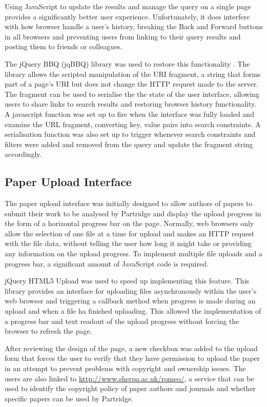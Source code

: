 Using JavaScript to update the results and manage the query on a single page
provides a significantly better user experience. Unfortunately, it does
interfere with how browser handle a user's history, breaking the Back and
Forward buttons in all browsers and preventing users from linking to their
query results and posting them to friends or colleagues.

The jQuery BBQ (jqBBQ) library was used to restore this functionality
\cite{jqbbq2013}. The library allows the scripted manipulation of the URI
fragment, a string that forms part of a page's URI but does not change the HTTP
request made to the server\cite{urifragment2013}. The fragment can be used to
serialise the the state of the user interface, allowing users to share links to
search results and restoring browser history functionality. A javascript
function was set up to fire when the interface was fully loaded and examine the
URL fragment, converting key, value pairs into search constraints. A
serialisation function was also set up to trigger whenever search constraints
and filters were added and removed from the query and update the fragment
string accordingly.

\subsection{ Paper Upload Interface }

The paper upload interface was initially designed to allow authors of papers to
submit their work to be analysed by Partridge and display the upload progress
in the form of a horizontal progress bar on the page. Normally, web browsers
only allow the selection of one file at a time for upload and makes an HTTP
request with the file data, without telling the user how long it might take or
providing any information on the upload progress. To implement multiple file
uploads and a progress bar, a significant amount of JavaScript code is
required. 

jQuery HTML5 Upload was used to speed up implementing this feature. This
library provides an interface for uploading files asynchronously within the
user's web browser and triggering a callback method when progress is made
during an upload and when a file ha finished uploading. This allowed the
implementation of a progress bar and text readout of the upload progress
without forcing the browser to refresh the page.

After reviewing the design of the page, a new checkbox was added to the upload
form that forces the user to verify that they have permission to upload the
paper in an attempt to prevent problems with copyright and ownership issues.
The users are also linked to \url{http://www.sherpa.ac.uk/romeo/}, a service
that can be used to identify the copyright policy of paper authors and
journals and whether specific papers can be used by Partridge. 

